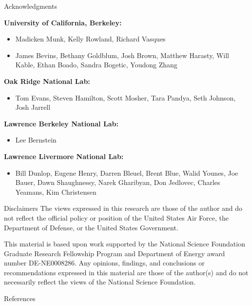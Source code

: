 \documentclass[xcolor=x11names,compress]{beamer}
\renewcommand{\(}{\begin{columns}}
\renewcommand{\)}{\end{columns}}
\newcommand{\<}[1]{\begin{column}{#1}}
\renewcommand{\>}{\end{column}}
\begin{document}
\begin{frame}{Acknowledgments }
 	  \footnotesize{\textbf{University of California, Berkeley:}
	  \begin{itemize}
	    \item Madicken Munk, Kelly Rowland, Richard Vasques
	    \item James Bevins, Bethany Goldblum, Josh Brown, Matthew Harasty, Will Kable, Ethan Boado, Sandra Bogetic, Youdong Zhang
	  \end{itemize}
	  
	  \textbf{Oak Ridge National Lab:}
	    \begin{itemize}
	      \item Tom Evans, Steven Hamilton, Scott Mosher, Tara Pandya, Seth Johnson, Josh Jarrell
	    \end{itemize}
	    
	  \textbf{Lawrence Berkeley National Lab:}
	    \begin{itemize}
	      \item Lee Bernstein
	    \end{itemize}
	    
	  \textbf{Lawrence Livermore National Lab:}
	  \begin{itemize}
	    \item Bill Dunlop, Eugene Henry, Darren Bleuel, Brent Blue, Walid Younes, Joe Bauer, Dawn Shaughnessy, Narek Gharibyan, Don Jedlovec, Charles Yeamans, Kim Christensen 
	  \end{itemize}}
\end{frame}

\begin{frame}{Disclaimers}
\centering  
The views expressed in this research are those of the author and do not reflect the official policy or position of the United States Air Force, the Department of Defense, or the United States Government. \newline
\vspace{0.5cm}  

This material is based upon work supported by the National Science Foundation Graduate Research Fellowship Program and Department of Energy award number DE-NE0008286. Any opinions, findings, and conclusions or recommendations expressed in this material are those of the author(s) and do not necessarily reflect the views of the National Science Foundation.
\end{frame}


\begin{frame}{References}
\small
        
\end{frame}

%	
%	
\end{document}
